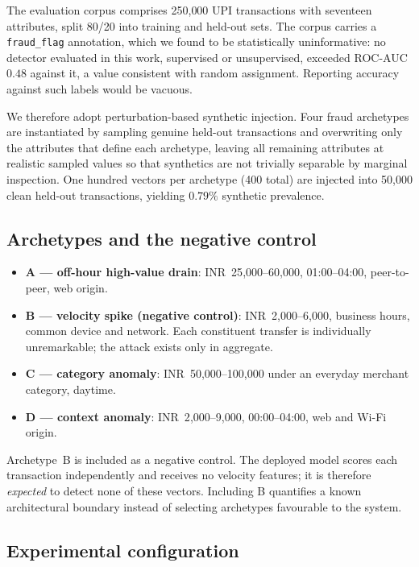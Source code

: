 \documentclass[journal]{IEEEtran}
\begin{document}
The evaluation corpus comprises 250{,}000 UPI transactions with seventeen
attributes, split 80/20 into training and held-out sets. The corpus carries a
\texttt{fraud\_flag} annotation, which we found to be statistically
uninformative: no detector evaluated in this work, supervised or
unsupervised, exceeded ROC-AUC $0.48$ against it, a value consistent with
random assignment. Reporting accuracy against such labels would be vacuous.

We therefore adopt perturbation-based synthetic injection. Four fraud
archetypes are instantiated by sampling genuine held-out transactions and
overwriting only the attributes that define each archetype, leaving all
remaining attributes at realistic sampled values so that synthetics are not
trivially separable by marginal inspection. One hundred vectors per
archetype (400 total) are injected into 50{,}000 clean held-out
transactions, yielding $0.79\%$ synthetic prevalence.

\subsection{Archetypes and the negative control}

\begin{itemize}
\item \textbf{A --- off-hour high-value drain}: INR~25{,}000--60{,}000,
01:00--04:00, peer-to-peer, web origin.
\item \textbf{B --- velocity spike (negative control)}:
INR~2{,}000--6{,}000, business hours, common device and network. Each
constituent transfer is individually unremarkable; the attack exists only in
aggregate.
\item \textbf{C --- category anomaly}: INR~50{,}000--100{,}000 under an
everyday merchant category, daytime.
\item \textbf{D --- context anomaly}: INR~2{,}000--9{,}000, 00:00--04:00,
web and Wi-Fi origin.
\end{itemize}

Archetype~B is included as a negative control. The deployed model scores each
transaction independently and receives no velocity features; it is therefore
\emph{expected} to detect none of these vectors. Including B quantifies a
known architectural boundary instead of selecting archetypes favourable to
the system.

\subsection{Experimental configuration}
\end{document}
